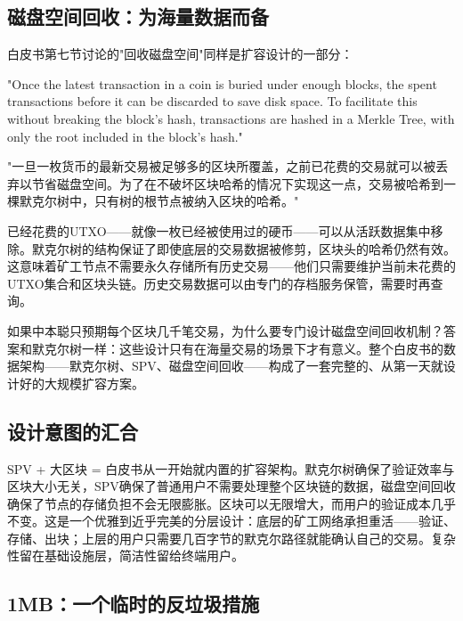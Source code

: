 \documentclass[a4paper,12pt,openany]{ctexbook}
\newenvironment{quoting}{%
  \par\vspace{0.5em}%
  \begin{list}{}{%
    \setlength{\leftmargin}{2em}%
    \setlength{\rightmargin}{2em}%
    \setlength{\parsep}{0.3em}%
    \setlength{\itemsep}{0pt}%
    \setlength{\topsep}{0pt}%
  }%
  \item\relax
}{%
  \end{list}%
  \par\vspace{0.5em}%
}
\begin{document}
\subsection*{磁盘空间回收：为海量数据而备}


白皮书第七节讨论的"回收磁盘空间"同样是扩容设计的一部分：


\begin{quoting}
\small
"Once the latest transaction in a coin is buried under enough blocks, the spent transactions before it can be discarded to save disk space. To facilitate this without breaking the block's hash, transactions are hashed in a Merkle Tree, with only the root included in the block's hash."

"一旦一枚货币的最新交易被足够多的区块所覆盖，之前已花费的交易就可以被丢弃以节省磁盘空间。为了在不破坏区块哈希的情况下实现这一点，交易被哈希到一棵默克尔树中，只有树的根节点被纳入区块的哈希。"
\end{quoting}


已经花费的UTXO——就像一枚已经被使用过的硬币——可以从活跃数据集中移除。默克尔树的结构保证了即使底层的交易数据被修剪，区块头的哈希仍然有效。这意味着矿工节点不需要永久存储所有历史交易——他们只需要维护当前未花费的UTXO集合和区块头链。历史交易数据可以由专门的存档服务保管，需要时再查询。

如果中本聪只预期每个区块几千笔交易，为什么要专门设计磁盘空间回收机制？答案和默克尔树一样：这些设计只有在海量交易的场景下才有意义。整个白皮书的数据架构——默克尔树、SPV、磁盘空间回收——构成了一套完整的、从第一天就设计好的大规模扩容方案。


\subsection*{设计意图的汇合}


SPV + 大区块 = 白皮书从一开始就内置的扩容架构。默克尔树确保了验证效率与区块大小无关，SPV确保了普通用户不需要处理整个区块链的数据，磁盘空间回收确保了节点的存储负担不会无限膨胀。区块可以无限增大，而用户的验证成本几乎不变。这是一个优雅到近乎完美的分层设计：底层的矿工网络承担重活——验证、存储、出块；上层的用户只需要几百字节的默克尔路径就能确认自己的交易。复杂性留在基础设施层，简洁性留给终端用户。


\subsection*{1MB：一个临时的反垃圾措施}
\end{document}
